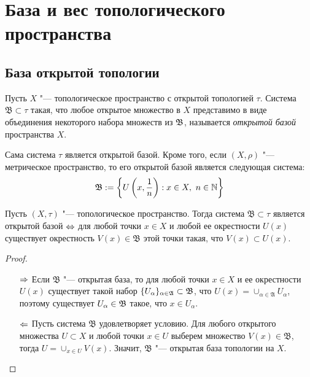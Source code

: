 \section{База и вес топологического пространства}

\subsection{База открытой топологии}

\begin{definition}
    Пусть $X$ "--- топологическое пространство с открытой топологией $\tau$. Система $\mathfrak{B} \subset \tau$ такая, что любое открытое множество в $X$ представимо в виде объединения некоторого набора множеств из $\mathfrak B$, называется \textit{открытой базой} пространства $X$.
\end{definition}

\begin{note}
    Сама система $\tau$ является открытой базой. Кроме того, если $(X, \rho)$ "--- метрическое пространство, то его открытой базой является следующая система:
    \[\mathfrak B := \left\{U\left(x, \frac 1n\right): x\in X,~n\in \mathbb N\right\}\]
\end{note}

\begin{proposition}\label{propbase}
    Пусть $(X, \tau)$ "--- топологическое пространство. Тогда система $\mathfrak{B} \subset \tau$ является открытой базой $\Leftrightarrow$ для любой точки $x \in X$ и любой ее окрестности $U(x)$ существует окрестность $V(x) \in \mathfrak{B}$ этой точки такая, что $V(x) \subset U(x)$.
\end{proposition}

\begin{proof}~
    \begin{itemize}
        \item[$\Rightarrow$] Если $\mathfrak{B}$ "--- открытая база, то для любой точки $x \in X$ и ее окрестности $U(x)$ существует такой набор $\{U_\alpha\}_{\alpha \in \mathfrak A} \subset \mathfrak B$, что $U(x) = \cup_{\alpha \in \mathfrak{A}} U_{\alpha}$, поэтому существует $U_\alpha \in \mathfrak B$ такое, что $x \in U_{\alpha}$.

        \item[$\Leftarrow$] Пусть система $\mathfrak{B}$ удовлетворяет условию. Для любого открытого множества $U \subset X$ и любой точки $x \in U$ выберем множество $V(x) \in \mathfrak{B}$, тогда $U = \cup_{x\in U}V(x)$. Значит, $\mathfrak{B}$ "--- открытая база топологии на $X$.\qedhere
    \end{itemize}
\end{proof}

